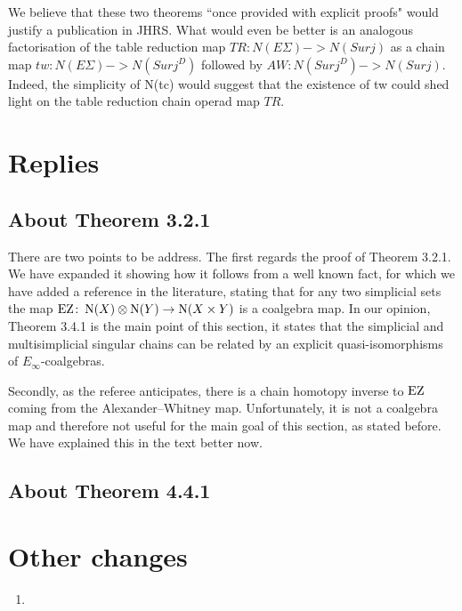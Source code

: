 \documentclass{amsart}
\begin{document}
	We believe that these two theorems ``once provided with explicit proofs" would justify a publication in JHRS.
	What would even be better is an analogous factorisation of the table reduction map $TR:N(E\Sigma)->N(Surj)$ as a chain map $tw:N(E\Sigma)->N(Surj^D)$ followed by $AW:N(Surj^D)->N(Surj)$.
	Indeed, the simplicity of N(tc) would suggest that the existence of tw could shed light on the table reduction chain operad map $TR$.

	\section{Replies}

	\subsection{About Theorem 3.2.1}

	There are two points to be address.
	The first regards the proof of Theorem 3.2.1.
	We have expanded it showing how it follows from a well known fact, for which we have added a reference in the literature, stating that for any two simplicial sets the map $\operatorname{EZ} \colon \operatorname{N}(X) \otimes \operatorname{N}(Y) \to \operatorname{N}(X \times Y)$ is a coalgebra map.
	In our opinion, Theorem 3.4.1 is the main point of this section, it states that the simplicial and multisimplicial singular chains can be related by an explicit quasi-isomorphisms of $E_\infty$-coalgebras.

	Secondly, as the referee anticipates, there is a chain homotopy inverse to $\operatorname{EZ}$ coming from the Alexander--Whitney map.
	Unfortunately, it is not a coalgebra map and therefore not useful for the main goal of this section, as stated before.
	We have explained this in the text better now.

	\subsection{About Theorem 4.4.1}

	\section{Other changes}

	\begin{enumerate}
		\item
	\end{enumerate}
\end{document}
